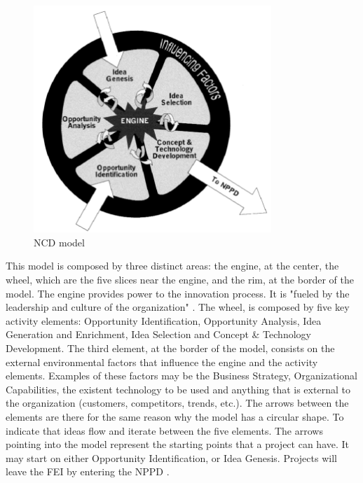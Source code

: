 \begin{figure}[bh]
\centering
\includegraphics[width=0.8\textwidth,keepaspectratio]{chapters/Value_Analysis/assets/NCD_Model.png}
\caption[NCD model]{NCD model\footnotemark}
\label{fig:ncdModel}
\end{figure}

\par
This model is composed by three distinct areas: the engine, at the center, the wheel, which are the five slices near the engine, and the rim, at the border of the model. The engine provides power to the innovation process. It is "fueled by the leadership and culture of the organization" \parencite{commonLanguageForFFE}. The wheel, is composed by five key activity elements: Opportunity Identification, Opportunity Analysis, Idea Generation and Enrichment, Idea Selection and Concept \& Technology Development. The third element, at the border of the model, consists on the external environmental factors that influence the engine and the activity elements. Examples of these factors may be the Business Strategy, Organizational Capabilities, the existent technology to be used and anything that is external to the organization (customers, competitors, trends, etc.). The arrows between the elements are there for the same reason why the model has a circular shape. To indicate that ideas flow and iterate between the five elements. The arrows pointing into the model represent the starting points that a project can have. It may start on either Opportunity Identification, or Idea Genesis. Projects will leave the \gls{FEI} by entering the \gls{NPPD} \parencite{commonLanguageForFFE}.

